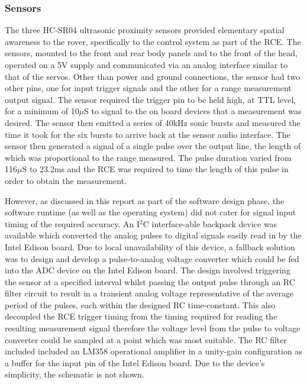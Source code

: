     \subsubsection{Sensors}
      The three HC-SR04 ultrasonic proximity sensors provided elementary spatial awareness to the rover, specifically to the control system as part of the RCE. The sensors, mounted to the front and rear body panels and to the front of the head, operated on a 5V supply and communicated via an analog interface similar to that of the servos. Other than power and ground connections, the sensor had two other pins, one for input trigger signals and the other for a range measurement output signal. The sensor required the trigger pin to be held high, at TTL level, for a minimum of 10$\mu$S to signal to the on board devices that a measurement was desired. The sensor then emitted a series of 40kHz sonic bursts and measured the time it took for the six bursts to arrive back at the sensor audio interface. The sensor then generated a signal of a single pulse over the output line, the length of which was proportional to the range measured. The pulse duration varied from 116$\mu$S to 23.2ms and the RCE was required to time the length of this pulse in order to obtain the measurement.
      
      However, as discussed in this report as part of the software design phase, the software runtime (as well as the operating system) did not cater for signal input timing of the required accuracy. An I$^2$C interface-able backpack device was available which converted the analog pulses to digital signals easily read in by the Intel Edison board. Due to local unavailability of this device, a fallback solution was to design and develop a pulse-to-analog voltage converter which could be fed into the ADC device on the Intel Edison board. The design involved triggering the sensor at a specified interval whilst passing the output pulse through an RC filter circuit to result in a transient analog voltage representative of the average period of the pulses, each within the designed RC time-constant. This also decoupled the RCE trigger timing from the timing required for reading the resulting measurement signal therefore the voltage level from the pulse to voltage converter could be sampled at a point which was most suitable. The RC filter included included an LM358 operational amplifier in a unity-gain configuration as a buffer for the input pin of the Intel Edison board. Due to the device's simplicity, the schematic is not shown.
            
